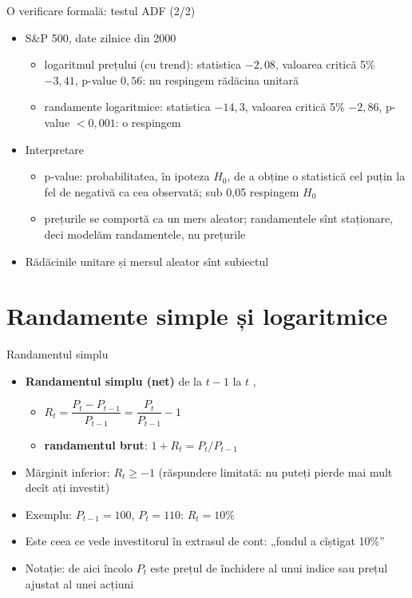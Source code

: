 \begin{frame}{O verificare formală: testul ADF (2/2)}
\itemsize{\small}
\begin{itemize}
    \item S\&P 500, date zilnice din 2000
    \begin{itemize}
        \item logaritmul prețului (cu trend): statistica $-2{,}08$, valoarea critică 5\% $-3{,}41$, p-value $0{,}56$: nu respingem rădăcina unitară
        \item randamente logaritmice: statistica $-14{,}3$, valoarea critică 5\% $-2{,}86$, p-value $< 0{,}001$: o respingem
    \end{itemize}
    \item Interpretare
    \begin{itemize}
        \item p-value: probabilitatea, în ipoteza $H_0$, de a obține o statistică cel puțin la fel de negativă ca cea observată; sub 0,05 respingem $H_0$
        \item prețurile se comportă ca un mers aleator; randamentele sînt staționare, deci modelăm randamentele, nu prețurile
    \end{itemize}
    \item Rădăcinile unitare și mersul aleator sînt subiectul 
\end{itemize}
\end{frame}


\section{Randamente simple și logaritmice}

\begin{frame}{Randamentul simplu}
\itemsize{\small}
\begin{itemize}
    \item \textbf{Randamentul simplu (net)} de la $t-1$ la $t$ , 
    \begin{itemize}
        \item $R_t = \dfrac{P_t - P_{t-1}}{P_{t-1}} = \dfrac{P_t}{P_{t-1}} - 1$
        \item \textbf{randamentul brut}: $1 + R_t = P_t / P_{t-1}$
    \end{itemize}
    \item Mărginit inferior: $R_t \ge -1$ (răspundere limitată: nu puteți pierde mai mult decît ați investit)
    \item Exemplu: $P_{t-1} = 100$, $P_t = 110$: $R_t = 10\%$
    \item Este ceea ce vede investitorul în extrasul de cont: „fondul a cîștigat 10\%”
    \item Notație: de aici încolo $P_t$ este prețul de închidere al unui indice sau prețul ajustat al unei acțiuni
\end{itemize}
\end{frame}

